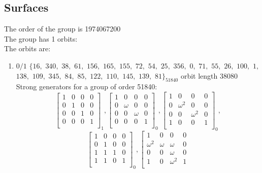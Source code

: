 \subsection*{Surfaces}
The order of the group is 1974067200\\
\bigskip
The group has 1 orbits: \\
The orbits are:
\begin{enumerate}[(1)]
\item
$0 / 1$ 
$
\{ 16,$ $340,$ $38,$ $61,$ $156,$ $165,$ $155,$ $72,$ $54,$ $25,$ $356,$ $0,$ $71,$ $55,$ $26,$ $100,$ $1,$ $138,$ $109,$ $345,$ $84,$ $85,$ $122,$ $110,$ $145,$ $139,$ $81 \}_{51840}$ orbit length $38080$\\
Strong generators for a group of order 51840:
$$
\left[
\begin{array}{*{4}{r}}
1 & 0 & 0 & 0\\
0 & 1 & 0 & 0\\
0 & 0 & 1 & 0\\
0 & 0 & 0 & 1\\
\end{array}
\right]
_{1}
, 
\left[
\begin{array}{*{4}{r}}
1 & 0 & 0 & 0\\
0 & \omega  & 0 & 0\\
0 & 0 & \omega  & 0\\
0 & 0 & 0 & 1\\
\end{array}
\right]
_{0}
, 
\left[
\begin{array}{*{4}{r}}
1 & 0 & 0 & 0\\
0 & \omega^{2} & 0 & 0\\
0 & 0 & \omega^{2} & 0\\
1 & 0 & 0 & 1\\
\end{array}
\right]
_{0}
, 
$$
$$
\left[
\begin{array}{*{4}{r}}
1 & 0 & 0 & 0\\
0 & 1 & 0 & 0\\
1 & 1 & 1 & 0\\
1 & 1 & 0 & 1\\
\end{array}
\right]
_{0}
, 
\left[
\begin{array}{*{4}{r}}
1 & 0 & 0 & 0\\
\omega^{2} & \omega  & \omega  & 0\\
0 & 0 & \omega  & 0\\
1 & 0 & \omega^{2} & 1\\
\end{array}
$$
\end{enumerate}
